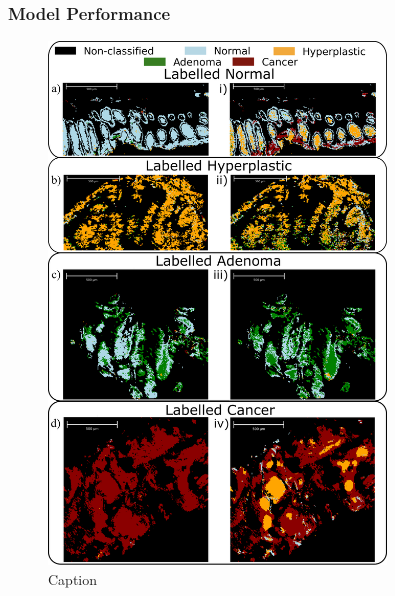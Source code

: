 \subsubsection{Model Performance}

\begin{figure}[htbp] 
    \centering 
    \includegraphics[width=0.8\textwidth]{Images/Categorisation_train_test.png} 
    \caption{Caption} \label{fig:my-label} 
\end{figure}

